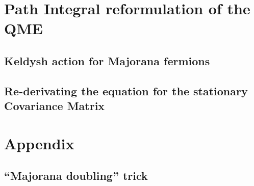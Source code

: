 \documentclass[a4paper,11pt]{article}
\begin{document}
  
 \section{Path Integral reformulation of the QME}
  \subsection{Keldysh action for Majorana fermions}
  \subsection{Re-derivating the equation for the stationary Covariance Matrix}

  \appendix
  \section*{Appendix}
    \renewcommand{\thesection}{A}
    \subsection{``Majorana doubling'' trick}
    \label{sec:majo_doubling_theory}
    
   
   
{}
  
\end{document}
